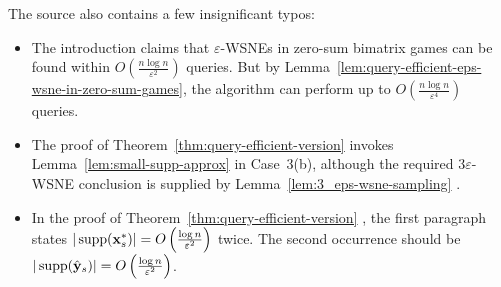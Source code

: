 The source also contains a few insignificant typos:
\begin{itemize}
  \item The introduction claims that \(\varepsilon\)-WSNEs in zero-sum bimatrix games can be found within \(O\left(\frac{n \log n}{\varepsilon^2}\right)\) queries. But by Lemma~\ref{lem:query-efficient-eps-wsne-in-zero-sum-games}, the algorithm can perform up to \(O\left(\frac{n \log n}{\varepsilon^4}\right)\) queries.
  \item The proof of Theorem~\ref{thm:query-efficient-version} \cite[proof of Theorem~2]{12WSNE} invokes Lemma~\ref{lem:small-supp-approx} \cite[Lemma~1]{12WSNE} in Case~3(b), although the required \(3\varepsilon\)-WSNE conclusion is supplied by Lemma~\ref{lem:3_eps-wsne-sampling} \cite[Lemma~2]{12WSNE}.
  \item In the proof of Theorem~\ref{thm:query-efficient-version} \cite[proof of Theorem~2]{12WSNE}, the first paragraph states \(|\operatorname{supp}(\mathbf{x}_s^*)| = O\left(\frac{\log n}{\varepsilon^2}\right)\) twice. The second occurrence should be \(|\operatorname{supp}(\hat{\mathbf{y}}_s)| = O\left(\frac{\log n}{\varepsilon^2}\right)\).
\end{itemize}

